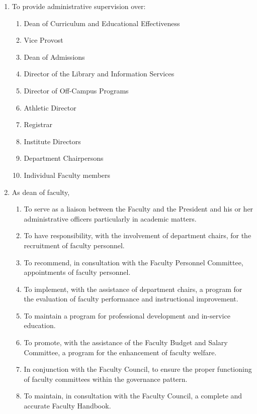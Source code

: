\documentclass[letterpaper, 11pt]{article}
\begin{document}
\begin{enumerate}[label=\alph*)]
{\begin{enumerate}[label=\arabic*)]
{									\begin{enumerate}[label=(\alph*)]
										\item{To provide administrative supervision over:
											\begin{enumerate}[label=(\arabic*)]
												\item{Dean of Curriculum and Educational Effectiveness}
												\item{Vice Provost}
												\item{Dean of Admissions}
												\item{Director of the Library and Information Services}
												\item{Director of Off-Campus Programs}
												\item{Athletic Director}
												\item{Registrar}
												\item{Institute Directors}
												\item{Department Chairpersons}
												\item{ Individual Faculty members}
											\end{enumerate}
										}
										\item{As dean of faculty,
											\begin{enumerate}[label=(\arabic*)]
												\item{To serve as a liaison between the Faculty and the President and his or her administrative officers particularly in academic matters.}
												\item{To have responsibility, with the involvement of department chairs, for the recruitment of faculty personnel.}
												\item{To recommend, in consultation with the Faculty Personnel Committee, appointments of faculty personnel.}
												\item{To implement, with the assistance of department chairs, a program for the evaluation of faculty performance and instructional improvement.}
												\item{To maintain a program for professional development and in-service education.}
												\item{To promote, with the assistance of the Faculty Budget and Salary Committee, a program for the enhancement of faculty welfare.}
												\item{In conjunction with the Faculty Council, to ensure the proper functioning of faculty committees within the governance pattern.}
												\item{To maintain, in consultation with the Faculty Council, a complete and accurate Faculty Handbook.}

\end{enumerate}}
\end{enumerate}}
\end{enumerate}}
\end{enumerate}
\end{document}
